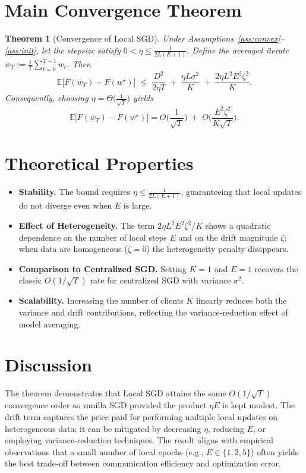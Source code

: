 \documentclass[11pt]{article}
\newtheorem{theorem}{Theorem}
\newcommand{\E}{\mathbb{E}}
\begin{document}
\section*{Main Convergence Theorem}
\begin{theorem}[Convergence of Local SGD]\label{thm:main}
Under Assumptions~\ref{ass:convex}–\ref{ass:init}, let the stepsize satisfy $0<\eta\le \frac{1}{2L(E+1)}$.
Define the averaged iterate $\bar w_T:=\frac1T\sum_{t=0}^{T-1} w_t$.
Then
\[
\E\!\big[F(\bar w_T)-F(w^\star)\big]\;\le\;
\frac{D^2}{2\eta T}
\;+\;
\frac{\eta L\sigma^2}{K}
\;+\;
\frac{2\eta L^2E^2\zeta^2}{K}.
\]
Consequently, choosing $\eta = \Theta\!\big(\frac{1}{\sqrt{T}}\big)$ yields
\[
\E\!\big[F(\bar w_T)-F(w^\star)\big]=O\!\Big(\frac{1}{\sqrt{T}}\Big)
\;+\;O\!\Big(\frac{E^2\zeta^2}{K\sqrt{T}}\Big).
\]
\end{theorem}

\section*{Theoretical Properties}
\begin{itemize}
\item \textbf{Stability.} The bound requires $\eta\le\frac1{2L(E+1)}$, guaranteeing that local updates do not diverge even when $E$ is large.
\item \textbf{Effect of Heterogeneity.} The term $2\eta L^2E^2\zeta^2/K$ shows a quadratic dependence on the number of local steps $E$ and on the drift magnitude $\zeta$; when data are homogeneous ($\zeta=0$) the heterogeneity penalty disappears.
\item \textbf{Comparison to Centralized SGD.} Setting $K=1$ and $E=1$ recovers the classic $O(1/\sqrt{T})$ rate for centralized SGD with variance $\sigma^2$.
\item \textbf{Scalability.} Increasing the number of clients $K$ linearly reduces both the variance and drift contributions, reflecting the variance‑reduction effect of model averaging.
\end{itemize}

\section*{Discussion}
The theorem demonstrates that Local SGD attains the same $O(1/\sqrt{T})$ convergence order as vanilla SGD provided the product $\eta E$ is kept modest.  The drift term captures the price paid for performing multiple local updates on heterogeneous data; it can be mitigated by decreasing $\eta$, reducing $E$, or employing variance‑reduction techniques.  The result aligns with empirical observations that a small number of local epochs (e.g., $E\in\{1,2,5\}$) often yields the best trade‑off between communication efficiency and optimization error.
\end{document}
